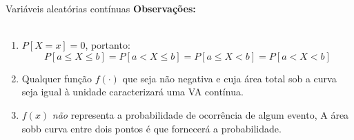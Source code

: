 \documentclass[10pt]{beamer}\usepackage[]{graphicx}\usepackage[]{color}
\providecommand{\E}{\text{E}}
\providecommand{\Var}{\text{Var}}
\theoremstyle{definition}
\begin{document}


\begin{frame}[fragile]{Variáveis aleatórias contínuas}
  \textbf{Observações:} \\~\\
  \begin{enumerate}
  \item $P[X=x] = 0$, portanto:
    \begin{equation*}
    P[a \leq X \leq b] = P[a < X \leq b] =
    P[a \leq X < b] = P[a < X < b]
  \end{equation*}
  \item Qualquer função $f(\cdot)$ que seja não negativa e cuja área
    total sob a curva seja igual à unidade caracterizará uma VA
    contínua.
  \item $f(x)$ \emph{não} representa a probabilidade de ocorrência de
    algum evento, A área sobb  curva entre dois pontos é que fornecerá a
    probabilidade.
  \end{enumerate}
\end{frame}
\end{document}
